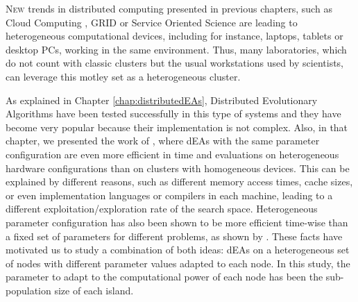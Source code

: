 \label{chap:adaptive}
\minitoc\mtcskip
\vfill
\lettrine{N}{ew} trends in distributed computing presented in previous chapters, such as Cloud Computing \cite{meri2013cloud}, GRID
\cite{Altunay2011OpenScience} or Service Oriented Science
\cite{Foster2005Science} are %
leading to heterogeneous computational devices, including for instance, laptops,
tablets or desktop PCs, working in the same
environment. Thus, many laboratories, which do not count with classic
clusters but the usual workstations used by scientists, can leverage
this motley set as a heterogeneous cluster. %

As explained in Chapter \ref{chap:distributedEAs}, Distributed Evolutionary
Algorithms have been tested successfully in this
type of systems \cite{Alba2002Heterogeneous} and they have become very popular because their implementation is
not complex. %
 Also, in that chapter, we presented the work of 
 \cite{Alba2002Heterogeneous}, where dEAs with the same parameter
 configuration are even %
more efficient in time and evaluations on heterogeneous hardware configurations than on clusters with
homogeneous devices. This can be explained by different reasons, such
as different memory access times, cache sizes, or even implementation
languages or compilers in each machine, leading to a different exploitation/exploration rate of the search space. 
Heterogeneous parameter configuration  has also been shown to be more  efficient time-wise than a fixed
set of parameters for different problems, as shown by  \cite{Gong2011HeterogeneousParameters}.   
These facts have motivated us to study a combination of both ideas:
dEAs on a heterogeneous set of nodes with different parameter values
adapted to each node. In this study, the parameter to adapt to the
computational power of each node has been the sub-population size of
each island. %


